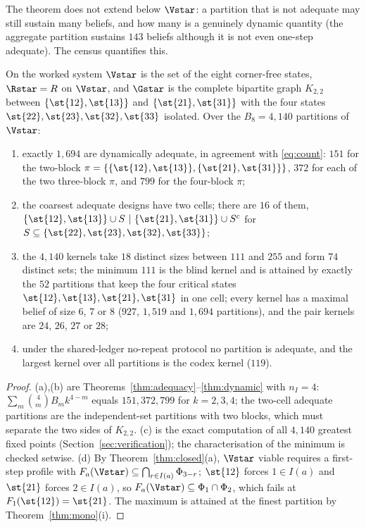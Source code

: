 The theorem does not extend below $\Vstar$: a partition that is not adequate may still sustain many beliefs, and how many is a genuinely dynamic quantity (the aggregate partition sustains $143$ beliefs although it is not even one-step adequate). The census quantifies this.

\begin{theorem}\label{thm:censusP}
On the worked system $\Vstar$ is the set of the eight corner-free states, $\Rstar=R$ on $\Vstar$, and $\Gstar$ is the complete bipartite graph $K_{2,2}$ between $\{\st{12},\st{13}\}$ and $\{\st{21},\st{31}\}$ with the four states $\st{22},\st{23},\st{32},\st{33}$ isolated. Over the $B_8=4{,}140$ partitions of $\Vstar$:
\begin{enumerate}[label=(\alph*),leftmargin=2em,itemsep=1pt]
\item exactly $1{,}694$ are dynamically adequate, in agreement with \eqref{eq:count}: $151$ for the two-block $\pi=\{\{\st{12},\st{13}\},\{\st{21},\st{31}\}\}$, $372$ for each of the two three-block $\pi$, and $799$ for the four-block $\pi$;
\item the coarsest adequate designs have two cells; there are $16$ of them, $\{\st{12},\st{13}\}\cup S\ |\ \{\st{21},\st{31}\}\cup S^{c}$ for $S\subseteq\{\st{22},\st{23},\st{32},\st{33}\}$;
\item the $4{,}140$ kernels take $18$ distinct sizes between $111$ and $255$ and form $74$ distinct sets; the minimum $111$ is the blind kernel and is attained by exactly the $52$ partitions that keep the four critical states $\st{12},\st{13},\st{21},\st{31}$ in one cell; every kernel has a maximal belief of size $6$, $7$ or $8$ ($927$, $1{,}519$ and $1{,}694$ partitions), and the pair kernels are $24$, $26$, $27$ or $28$;
\item under the shared-ledger no-repeat protocol no partition is adequate, and the largest kernel over all partitions is the codex kernel ($119$).
\end{enumerate}
\end{theorem}

\begin{proof}
(a),(b) are Theorems~\ref{thm:adequacy}--\ref{thm:dynamic} with $n_I=4$: $\sum_m\binom4m B_m k^{4-m}$ equals $151,372,799$ for $k=2,3,4$; the two-cell adequate partitions are the independent-set partitions with two blocks, which must separate the two sides of $K_{2,2}$. (c) is the exact computation of all $4{,}140$ greatest fixed points (Section~\ref{sec:verification}); the characterisation of the minimum is checked setwise. (d) By Theorem~\ref{thm:closed}(a), $\Vstar$ viable requires a first-step profile with $F_a(\Vstar)\subseteq\bigcap_{r\in I(a)}\Phi_{3-r}$; $\st{12}$ forces $1\in I(a)$ and $\st{21}$ forces $2\in I(a)$, so $F_a(\Vstar)\subseteq\Phi_1\cap\Phi_2$, which fails at $F_1(\st{12})=\st{21}$. The maximum is attained at the finest partition by Theorem~\ref{thm:mono}(i).
\end{proof}

